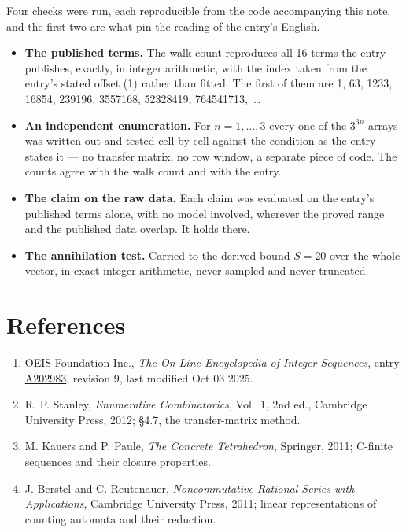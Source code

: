 \documentclass[11pt]{article}
\theoremstyle{definition}
\begin{document}
Four checks were run, each reproducible from the code accompanying this note, and the first two are what pin the reading of the entry's English.

\begin{itemize}

\item {\bfseries The published terms.} The walk count reproduces all 16 terms the entry publishes, exactly, in integer arithmetic, with the index taken from the entry's stated offset (1) rather than fitted. The first of them are 1, 63, 1233, 16854, 239196, 3557168, 52328419, 764541713,~\dots

\item {\bfseries An independent enumeration.} For $n = 1,\dots,3$ every one of the $3^{3n}$ arrays was written out and tested cell by cell against the condition as the entry states it --- no transfer matrix, no row window, a separate piece of code. The counts agree with the walk count and with the entry.

\item {\bfseries The claim on the raw data.} Each claim was evaluated on the entry's published terms alone, with no model involved, wherever the proved range and the published data overlap. It holds there.

\item {\bfseries The annihilation test.} Carried to the derived bound $S = 20$ over the whole vector, in exact integer arithmetic, never sampled and never truncated.

\end{itemize}

\section{References}

\begin{enumerate}

\item OEIS Foundation Inc., \emph{The On-Line Encyclopedia of Integer Sequences}, entry \href{https://oeis.org/A202983}{A202983}, revision 9, last modified Oct 03 2025.

\item R. P. Stanley, \emph{Enumerative Combinatorics}, Vol.~1, 2nd ed., Cambridge University Press, 2012; \S4.7, the transfer-matrix method.

\item M. Kauers and P. Paule, \emph{The Concrete Tetrahedron}, Springer, 2011; C-finite sequences and their closure properties.

\item J. Berstel and C. Reutenauer, \emph{Noncommutative Rational Series with Applications}, Cambridge University Press, 2011; linear representations of counting automata and their reduction.

\end{enumerate}
\end{document}

